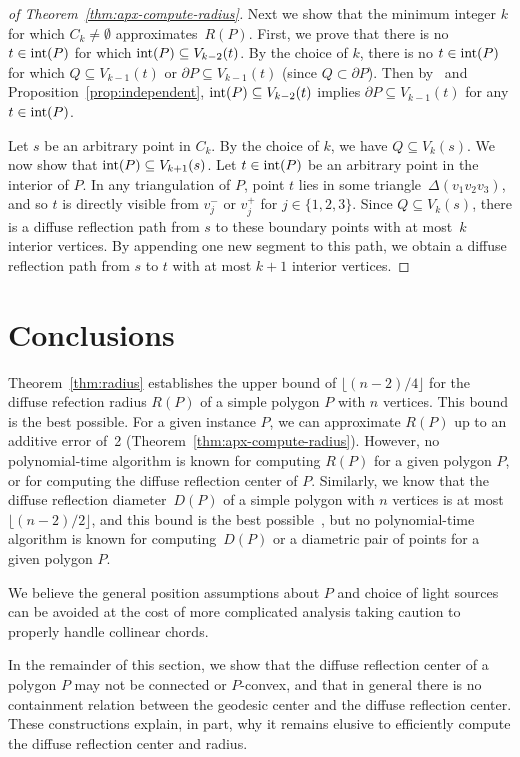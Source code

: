 \documentclass[12pt]{article}
\begin{document}
\begin{proof}[of Theorem~\ref{thm:apx-compute-radius}]
Next we show that the minimum integer $k$ for which $C_k\neq \emptyset$ approximates~$R(P)$.
First, we prove that there is no $t\in {\rm int}(P)$ for which ${\rm int}(P)\subseteq V_{k-2}(t)$.
By the choice of $k$, there is no $t\in {\rm int}(P)$ for which $Q\subseteq V_{k-1}(t)$ or $\partial P \subseteq V_{k-1}(t)$ (since $Q\subset \partial P$).
Then by~\cite{Us} and Proposition~\ref{prop:independent}, ${\rm int}(P)\subseteq V_{k-2}(t)$ implies $\partial P\subseteq V_{k-1}(t)$ for any $t\in {\rm int}(P)$.

Let $s$ be an arbitrary point in $C_k$. By the choice of $k$, we have
$Q\subseteq V_k(s)$. We now show that ${\rm int}(P)\subseteq V_{k+1}(s)$.
Let $t\in {\rm int}(P)$ be an arbitrary point in the interior of $P$.
In any triangulation of $P$, point $t$ lies in some triangle~$\Delta(v_1 v_2 v_3)$, and so $t$ is directly visible from
$v_j^-$ or $v_j^+$ for $j \in \{1,2,3\}$. Since $Q\subseteq V_k(s)$,
there is a diffuse reflection path from $s$ to these boundary points
with at most~$k$ interior vertices. By appending one new segment to this
path, we obtain a diffuse reflection path from $s$ to $t$ with at most
$k+1$ interior vertices.
\end{proof}


\section{Conclusions}
\label{sec:con}

Theorem~\ref{thm:radius} establishes the upper bound of $\lfloor (n-2)/4\rfloor$ for the diffuse refection radius $R(P)$ of a simple polygon $P$ with $n$ vertices. This bound is the best possible. For a given instance $P$, we can approximate $R(P)$ up to an additive error of~2 (Theorem~\ref{thm:apx-compute-radius}). However, no polynomial-time algorithm is known for computing $R(P)$ for a given polygon $P$, or for computing the diffuse reflection center of $P$. Similarly, we know that the diffuse reflection diameter~$D(P)$ of a simple polygon with $n$ vertices is at most $\lfloor (n-2)/2\rfloor$, and this bound is the best possible~\cite{Us}, but no polynomial-time algorithm is known for computing~$D(P)$ or a diametric pair of points for a given polygon $P$.

We believe the general position assumptions about $P$ and choice of light sources
  can be avoided at the cost of more complicated analysis taking
  caution to properly handle collinear chords.

In the remainder of this section, we show that the diffuse reflection center of a polygon $P$ may not be connected or $P$-convex, and that in general there is no containment relation between the geodesic center and the diffuse reflection center. These constructions explain, in part, why it remains elusive to efficiently compute the diffuse reflection center and radius.
\end{document}
